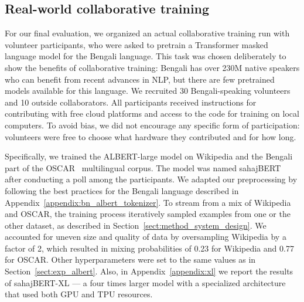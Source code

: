 \vspace{-6pt}
\subsection{Real-world collaborative training}\label{sect:exp_bengali}
\vspace{-4pt}

For our final evaluation, we organized an actual collaborative training run with volunteer participants, who were asked to pretrain a Transformer masked language model for the Bengali language. This task was chosen deliberately to show the benefits of collaborative training: Bengali has over 230M native speakers who can benefit from recent advances in NLP, but there are few pretrained models available for this language.
We recruited 30 Bengali-speaking volunteers and 10 outside collaborators. All participants received instructions for contributing with free cloud platforms and access to the code for training on local computers. To avoid bias, we did not encourage any specific form of participation: volunteers were free to choose what hardware they contributed and for how long.

Specifically, we trained the ALBERT-large model on Wikipedia and the Bengali part of the OSCAR~\cite{Oscar} multilingual corpus. The model was named sahajBERT after conducting a poll among the participants. We adapted our preprocessing by following the best practices for the Bengali language described in Appendix~\ref{appendix:bn_albert_tokenizer}. To stream from a mix of Wikipedia and OSCAR, the training process iteratively sampled examples from one or the other dataset, as described in Section~\ref{sect:method_system_design}. We accounted for uneven size and quality of data by oversampling Wikipedia by a factor of 2, which resulted in mixing probabilities of 0.23 for Wikipedia and 0.77 for OSCAR. Other hyperparameters were set to the same values as in Section~\ref{sect:exp_albert}. Also, in Appendix~\ref{appendix:xl} we report the results of sahajBERT-XL --- a four times larger model with a specialized architecture that used both GPU and TPU resources.

